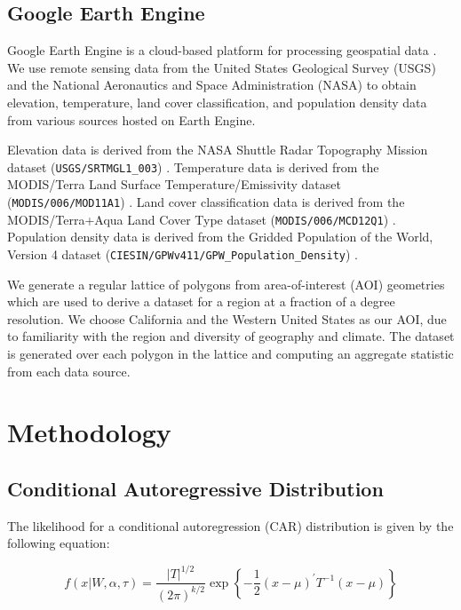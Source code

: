 \documentclass[notitlepage]{article}
\begin{document}
\subsection{Google Earth Engine}

Google Earth Engine is a cloud-based platform for processing geospatial data \cite{gorelick_google_2017}.
We use remote sensing data from the United States Geological Survey (USGS) and the National Aeronautics and Space Administration (NASA) to obtain elevation, temperature, land cover classification, and population density data from various sources hosted on Earth Engine.

Elevation data is derived from the NASA Shuttle Radar Topography Mission dataset (\texttt{USGS/SRTMGL1\_003}) \cite{nasa_srtmg}.
Temperature data is derived from the MODIS/Terra Land Surface Temperature/Emissivity dataset (\texttt{MODIS/006/MOD11A1}) \cite{wan_zhengming_mod11a1_2015}.
Land cover classification data is derived from the MODIS/Terra+Aqua Land Cover Type dataset (\texttt{MODIS/006/MCD12Q1}) \cite{friedl_mark_mcd12q1_2019}.
Population density data is derived from the Gridded Population of the World, Version 4 dataset (\texttt{CIESIN/GPWv411/GPW\_Population\_Density}) \cite{gpwv4}.

We generate a regular lattice of polygons from area-of-interest (AOI) geometries which are used to derive a dataset for a region at a fraction of a degree resolution.
We choose California and the Western United States as our AOI, due to familiarity with the region and diversity of geography and climate.
The dataset is generated over each polygon in the lattice and computing an aggregate statistic from each data source.

\section{Methodology}

\subsection{Conditional Autoregressive Distribution}

The likelihood for a conditional autoregression (CAR) distribution is given by the following equation:

\begin{equation}
f(x|W, \alpha, \tau) =
    \frac{|T|^{1/2}}{(2\pi)^{k/2}}
    \exp \left\{
        -\frac{1}{2} (x - \mu)^\prime T^{-1} (x - \mu)
    \right\}
\end{equation}
\end{document}
